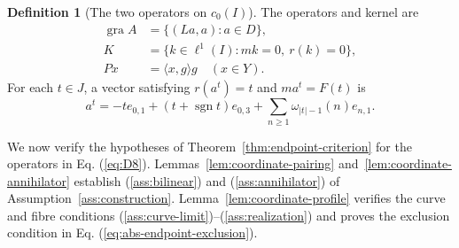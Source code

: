 \documentclass[11pt]{article}
\newcommand{\gra}{\operatorname{gra}}
\newcommand{\sgn}{\operatorname{sgn}}
\newcommand{\pair}[2]{\langle #1,#2\rangle}
\theoremstyle{definition}
\newtheorem{definition}{Definition}
\theoremstyle{remark}
\begin{document}
\begin{definition}[The two operators on $c_0(I)$]
The operators and kernel are
\begin{equation}
\begin{aligned}
\gra A&=\{(La,a):a\in D\},\\
K&=\{k\in\ell^1(I):mk=0,\ r(k)=0\},\\
Px&=\pair{x}{g}g\quad(x\in Y).
\end{aligned}
\label{eq:D8}
\end{equation}
For each $t\in J$, a vector satisfying $r(a^t)=t$ and $ma^t=F(t)$ is
\begin{equation}
a^t=-t e_{0,1}+(t+\sgn t)e_{0,3}
       +\sum_{n\ge1}\omega_{|t|-1}(n)e_{n,1}.
\label{eq:D9}
\end{equation}
\end{definition}

\label{sec:supporting}
We now verify the hypotheses of Theorem~\ref{thm:endpoint-criterion} for the operators in Eq. (\ref{eq:D8}). Lemmas~\ref{lem:coordinate-pairing} and~\ref{lem:coordinate-annihilator} establish \textup{(\ref{ass:bilinear})} and \textup{(\ref{ass:annihilator})} of Assumption~\ref{ass:construction}. Lemma~\ref{lem:coordinate-profile} verifies the curve and fibre conditions \textup{(\ref{ass:curve-limit})}--\textup{(\ref{ass:realization})} and proves the exclusion condition in Eq. (\ref{eq:abs-endpoint-exclusion}).
\end{document}
